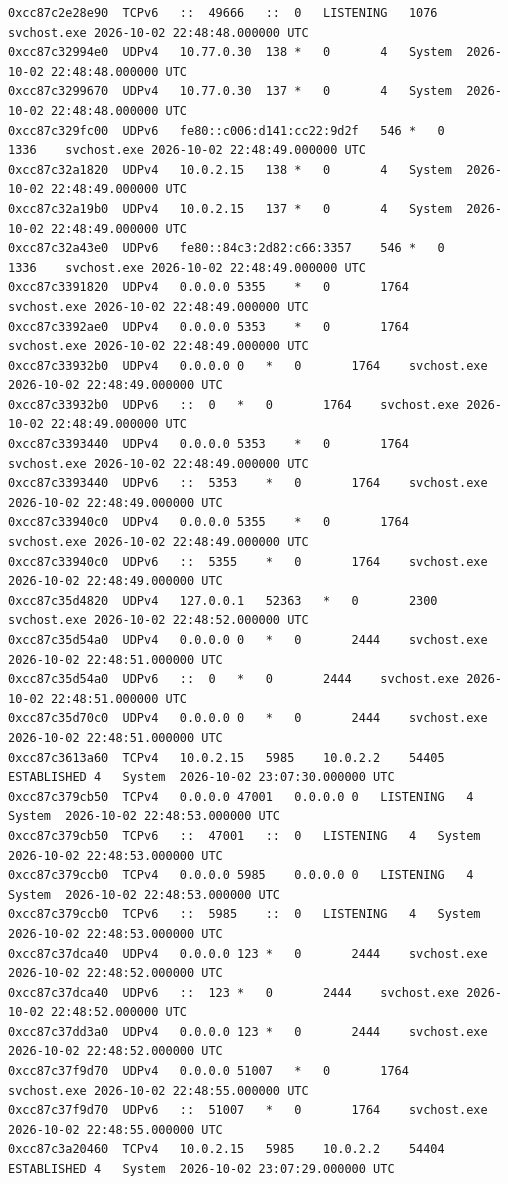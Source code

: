 \documentclass[11pt,letterpaper]{article}
\begin{document}
\begin{lstlisting}
0xcc87c2e28e90	TCPv6	::	49666	::	0	LISTENING	1076	svchost.exe	2026-10-02 22:48:48.000000 UTC
0xcc87c32994e0	UDPv4	10.77.0.30	138	*	0		4	System	2026-10-02 22:48:48.000000 UTC
0xcc87c3299670	UDPv4	10.77.0.30	137	*	0		4	System	2026-10-02 22:48:48.000000 UTC
0xcc87c329fc00	UDPv6	fe80::c006:d141:cc22:9d2f	546	*	0		1336	svchost.exe	2026-10-02 22:48:49.000000 UTC
0xcc87c32a1820	UDPv4	10.0.2.15	138	*	0		4	System	2026-10-02 22:48:49.000000 UTC
0xcc87c32a19b0	UDPv4	10.0.2.15	137	*	0		4	System	2026-10-02 22:48:49.000000 UTC
0xcc87c32a43e0	UDPv6	fe80::84c3:2d82:c66:3357	546	*	0		1336	svchost.exe	2026-10-02 22:48:49.000000 UTC
0xcc87c3391820	UDPv4	0.0.0.0	5355	*	0		1764	svchost.exe	2026-10-02 22:48:49.000000 UTC
0xcc87c3392ae0	UDPv4	0.0.0.0	5353	*	0		1764	svchost.exe	2026-10-02 22:48:49.000000 UTC
0xcc87c33932b0	UDPv4	0.0.0.0	0	*	0		1764	svchost.exe	2026-10-02 22:48:49.000000 UTC
0xcc87c33932b0	UDPv6	::	0	*	0		1764	svchost.exe	2026-10-02 22:48:49.000000 UTC
0xcc87c3393440	UDPv4	0.0.0.0	5353	*	0		1764	svchost.exe	2026-10-02 22:48:49.000000 UTC
0xcc87c3393440	UDPv6	::	5353	*	0		1764	svchost.exe	2026-10-02 22:48:49.000000 UTC
0xcc87c33940c0	UDPv4	0.0.0.0	5355	*	0		1764	svchost.exe	2026-10-02 22:48:49.000000 UTC
0xcc87c33940c0	UDPv6	::	5355	*	0		1764	svchost.exe	2026-10-02 22:48:49.000000 UTC
0xcc87c35d4820	UDPv4	127.0.0.1	52363	*	0		2300	svchost.exe	2026-10-02 22:48:52.000000 UTC
0xcc87c35d54a0	UDPv4	0.0.0.0	0	*	0		2444	svchost.exe	2026-10-02 22:48:51.000000 UTC
0xcc87c35d54a0	UDPv6	::	0	*	0		2444	svchost.exe	2026-10-02 22:48:51.000000 UTC
0xcc87c35d70c0	UDPv4	0.0.0.0	0	*	0		2444	svchost.exe	2026-10-02 22:48:51.000000 UTC
0xcc87c3613a60	TCPv4	10.0.2.15	5985	10.0.2.2	54405	ESTABLISHED	4	System	2026-10-02 23:07:30.000000 UTC
0xcc87c379cb50	TCPv4	0.0.0.0	47001	0.0.0.0	0	LISTENING	4	System	2026-10-02 22:48:53.000000 UTC
0xcc87c379cb50	TCPv6	::	47001	::	0	LISTENING	4	System	2026-10-02 22:48:53.000000 UTC
0xcc87c379ccb0	TCPv4	0.0.0.0	5985	0.0.0.0	0	LISTENING	4	System	2026-10-02 22:48:53.000000 UTC
0xcc87c379ccb0	TCPv6	::	5985	::	0	LISTENING	4	System	2026-10-02 22:48:53.000000 UTC
0xcc87c37dca40	UDPv4	0.0.0.0	123	*	0		2444	svchost.exe	2026-10-02 22:48:52.000000 UTC
0xcc87c37dca40	UDPv6	::	123	*	0		2444	svchost.exe	2026-10-02 22:48:52.000000 UTC
0xcc87c37dd3a0	UDPv4	0.0.0.0	123	*	0		2444	svchost.exe	2026-10-02 22:48:52.000000 UTC
0xcc87c37f9d70	UDPv4	0.0.0.0	51007	*	0		1764	svchost.exe	2026-10-02 22:48:55.000000 UTC
0xcc87c37f9d70	UDPv6	::	51007	*	0		1764	svchost.exe	2026-10-02 22:48:55.000000 UTC
0xcc87c3a20460	TCPv4	10.0.2.15	5985	10.0.2.2	54404	ESTABLISHED	4	System	2026-10-02 23:07:29.000000 UTC

\end{lstlisting}
\end{document}
